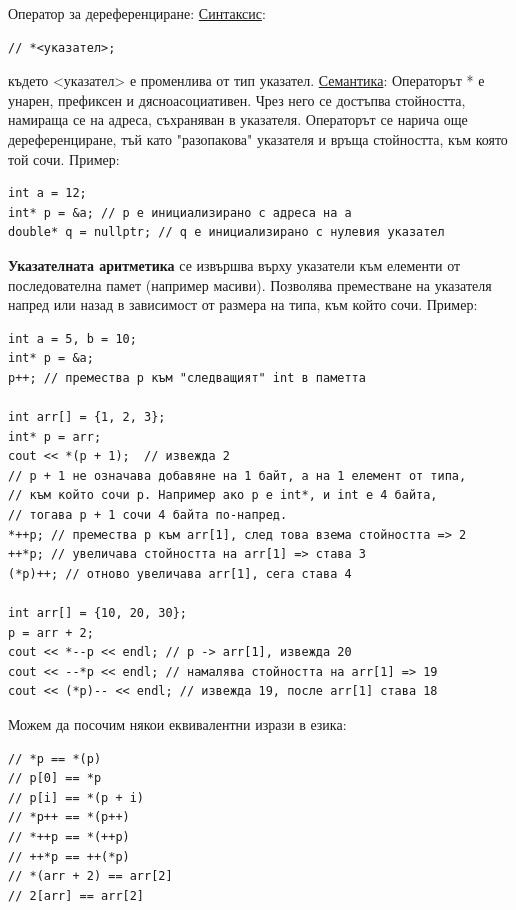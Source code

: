 \documentclass{article}
\begin{document}
Оператор за дереференциране: \newline\newline
\underline{Синтаксис}:
\begin{lstlisting}[style=cpp]
// *<указател>;
\end{lstlisting}
където <указател> е променлива от тип указател. \newline\newline
\underline{Семантика}:
Операторът * е унарен, префиксен и дясноасоциативен. Чрез него се достъпва стойността, намираща се на адреса, съхраняван в указателя. Операторът се нарича още
дереференциране, тъй като "разопакова" указателя и връща стойността, към която той сочи. \newline\newline
Пример:
\begin{lstlisting}[style=cpp]
int a = 12;
int* p = &a; // p е инициализирано с адреса на a
double* q = nullptr; // q е инициализирано с нулевия указател
\end{lstlisting}
\textbf{Указателната аритметика} се извършва върху указатели към елементи от последователна памет (например масиви). Позволява преместване на указателя напред
или назад в зависимост от размера на типа, към който сочи. \newline\newline
Пример:
\begin{lstlisting}[style=cpp]
int a = 5, b = 10;
int* p = &a;
p++; // премества p към "следващият" int в паметта

int arr[] = {1, 2, 3};
int* p = arr;
cout << *(p + 1);  // извежда 2
// p + 1 не означава добавяне на 1 байт, а на 1 елемент от типа,
// към който сочи p. Например ако p е int*, и int е 4 байта,
// тогава p + 1 сочи 4 байта по-напред.
*++p; // премества p към arr[1], след това взема стойността => 2
++*p; // увеличава стойността на arr[1] => става 3
(*p)++; // отново увеличава arr[1], сега става 4

int arr[] = {10, 20, 30};
p = arr + 2;
cout << *--p << endl; // p -> arr[1], извежда 20
cout << --*p << endl; // намалява стойността на arr[1] => 19
cout << (*p)-- << endl; // извежда 19, после arr[1] става 18
\end{lstlisting}
Можем да посочим някои еквивалентни изрази в езика:
\begin{lstlisting}[style=cpp]
// *p == *(p)
// p[0] == *p
// p[i] == *(p + i)
// *p++ == *(p++)
// *++p == *(++p)
// ++*p == ++(*p)
// *(arr + 2) == arr[2]
// 2[arr] == arr[2]
\end{lstlisting}
\end{document}
